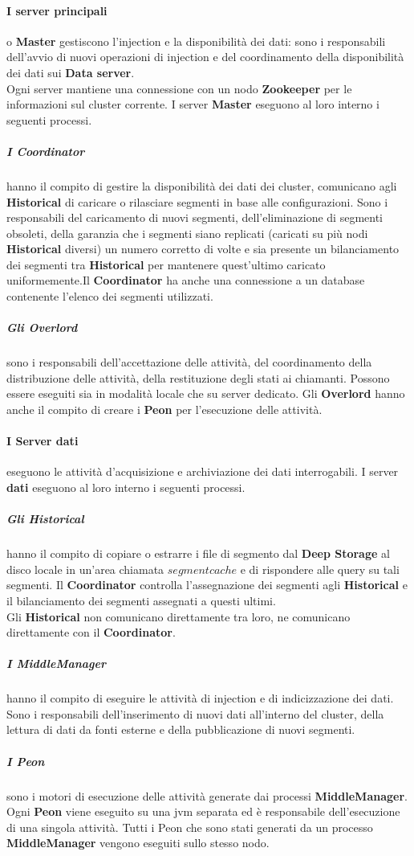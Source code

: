 \paragraph{I server principali} o \textbf{Master} gestiscono l’\gls{injection}{} e la disponibilità dei dati: sono i responsabili dell’avvio
di nuovi operazioni di \gls{injection}{} e del coordinamento della disponibilità dei dati sui \textbf{Data server}.\\
Ogni server mantiene una connessione con un nodo \textbf{Zookeeper} per le informazioni sul \gls{cluster}{} corrente.
I server \textbf{Master} eseguono al loro interno i seguenti processi.
\subparagraph{I Coordinator} hanno il compito di gestire la disponibilità dei dati dei \gls{cluster}{}, comunicano
agli \textbf{Historical} di caricare o rilasciare segmenti in base alle configurazioni. Sono i 
responsabili del caricamento di nuovi segmenti, dell’eliminazione di segmenti obsoleti, della
garanzia che i segmenti siano replicati (caricati su più nodi \textbf{Historical} diversi) un
numero corretto  di volte e sia presente un bilanciamento dei segmenti
tra \textbf{Historical} per mantenere quest’ultimo caricato uniformemente.Il \textbf{Coordinator} ha anche una connessione a un database
contenente l’elenco dei segmenti utilizzati. 
\subparagraph{Gli Overlord} sono i responsabili dell’accettazione delle attività, del coordinamento della distribuzione delle
attività, della restituzione degli stati ai
chiamanti. Possono essere eseguiti sia in modalità locale che su server dedicato. Gli \textbf{Overlord} hanno anche il compito di 
creare i \textbf{Peon} per l'esecuzione delle attività. 
\paragraph{I Server dati} eseguono le attività d'acquisizione e archiviazione dei dati interrogabili.
I server \textbf{dati} eseguono al loro interno i seguenti processi.
\subparagraph{Gli Historical} hanno il compito di copiare o estrarre i file di segmento dal \textbf{Deep Storage} al disco locale in un’area
chiamata $segment cache$ e di rispondere alle query su tali segmenti.
Il \textbf{Coordinator} controlla l’assegnazione dei segmenti agli \textbf{Historical} e il bilanciamento dei segmenti assegnati
a questi ultimi.\\ 
Gli \textbf{Historical} non comunicano direttamente tra loro, ne comunicano direttamente con il \textbf{Coordinator}. 
\subparagraph{I MiddleManager} 
hanno il compito di eseguire le attività di \gls{injection}{} e di indicizzazione dei dati.\\
Sono i responsabili dell'inserimento di nuovi dati all'interno del \gls{cluster}{}, della lettura di dati da fonti esterne e della pubblicazione di 
nuovi segmenti.\\
\subparagraph{I Peon} sono i motori di esecuzione delle attività generate dai processi \textbf{MiddleManager}. \\
Ogni \textbf{Peon} viene eseguito su una \gls{jvm}{} separata ed è responsabile dell’esecuzione di una singola attività. 
Tutti i Peon che sono stati generati da un processo \textbf{MiddleManager} vengono eseguiti sullo stesso nodo.
